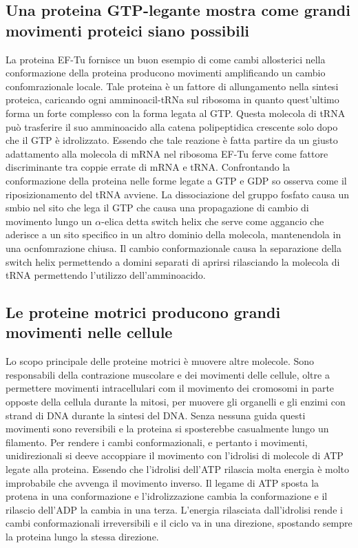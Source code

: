 \subsection{Una proteina GTP-legante mostra come grandi movimenti proteici siano possibili}
La proteina EF-Tu fornisce un buon esempio di come cambi allosterici nella conformazione della proteina producono movimenti amplificando un cambio confomrazionale locale. Tale proteina
\`e un fattore di allungamento nella sintesi proteica, caricando ogni amminoacil-tRNa sul ribosoma in quanto quest'ultimo forma un forte complesso con la forma legata al GTP. Questa 
molecola di tRNA pu\`o trasferire il suo amminoacido alla catena polipeptidica crescente solo dopo che il GTP \`e idrolizzato. Essendo che tale reazione \`e fatta partire da un giusto
adattamento alla molecola di mRNA nel ribosoma EF-Tu ferve come fattore discriminante tra coppie errate di mRNA e tRNA. Confrontando la conformazione della proteina nelle forme legate
a GTP e GDP so osserva come il riposizionamento del tRNA avviene. La dissociazione del gruppo fosfato causa un smbio nel sito che lega il GTP che causa una propagazione di cambio di 
movimento lungo un $\alpha$-elica detta switch helix che serve come aggancio che aderisce a un sito specifico in un altro dominio della molecola, mantenendola in una ocnfomrazione 
chiusa. Il cambio conformazionale causa la separazione della switch helix permettendo a domini separati di aprirsi rilasciando la molecola di tRNA permettendo l'utilizzo 
dell'amminoacido. 
\subsection{Le proteine motrici producono grandi movimenti nelle cellule}
Lo scopo principale delle proteine motrici \`e muovere altre molecole. Sono responsabili della contrazione muscolare e dei movimenti delle cellule, oltre a permettere movimenti 
intracellulari com il movimento dei cromosomi in parte opposte della cellula durante la mitosi, per muovere gli organelli e gli enzimi con strand di DNA durante la sintesi del DNA. 
Senza nessuna guida questi movimenti sono reversibili e la proteina si sposterebbe casualmente lungo un filamento. Per rendere i cambi conformazionali, e pertanto i movimenti, 
unidirezionali si deeve accoppiare il movimento con l'idrolisi di molecole di ATP legate alla proteina. Essendo che l'idrolisi dell'ATP rilascia molta energia \`e molto improbabile che
avvenga il movimento inverso. Il legame di ATP sposta la protena in una conformazione e l'idrolizzazione cambia la conformazione e il rilascio dell'ADP la cambia in una terza. L'energia
rilasciata dall'idrolisi rende i cambi conformazionali irreversibili e il ciclo va in una direzione, spostando sempre la proteina lungo la stessa direzione. 
